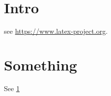 \documentclass{article}
\begin{document}
\tableofcontents

\clearpage

\section{Intro}\label{intro}

see \url{https://www.latex-project.org}.

\clearpage

\section{Something}

See \ref{intro}
\end{document}
